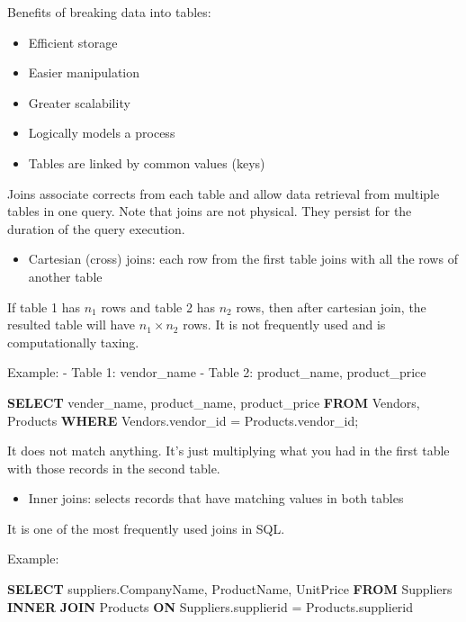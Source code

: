 \documentclass[]{book}
\newenvironment{Shaded}{\begin{snugshade}}{\end{snugshade}}
\newcommand{\KeywordTok}[1]{\textcolor[rgb]{0.13,0.29,0.53}{\textbf{{#1}}}}
\newcommand{\NormalTok}[1]{{#1}}
\providecommand{\tightlist}{%
  \setlength{\itemsep}{0pt}\setlength{\parskip}{0pt}}
\theoremstyle{definition}
\theoremstyle{definition}
\theoremstyle{remark}
\begin{document}
Benefits of breaking data into tables:

\begin{itemize}
\tightlist
\item
  Efficient storage
\item
  Easier manipulation
\item
  Greater scalability
\item
  Logically models a process
\item
  Tables are linked by common values (keys)
\end{itemize}

Joins associate corrects from each table and allow data retrieval from
multiple tables in one query. Note that joins are not physical. They
persist for the duration of the query execution.

\begin{itemize}
\tightlist
\item
  Cartesian (cross) joins: each row from the first table joins with all
  the rows of another table
\end{itemize}

If table 1 has \(n_1\) rows and table 2 has \(n_2\) rows, then after
cartesian join, the resulted table will have \(n_1 \times n_2\) rows. It
is not frequently used and is computationally taxing.

Example: - Table 1: vendor\_name - Table 2: product\_name,
product\_price

\begin{Shaded}
\begin{Highlighting}[]
\KeywordTok{SELECT} \NormalTok{vender_name, product_name, product_price}
\KeywordTok{FROM} \NormalTok{Vendors, Products}
\KeywordTok{WHERE} \NormalTok{Vendors.vendor_id = Products.vendor_id;}
\end{Highlighting}
\end{Shaded}

It does not match anything. It's just multiplying what you had in the
first table with those records in the second table.

\begin{itemize}
\tightlist
\item
  Inner joins: selects records that have matching values in both tables
\end{itemize}

It is one of the most frequently used joins in SQL.

Example:

\begin{Shaded}
\begin{Highlighting}[]
\KeywordTok{SELECT} \NormalTok{suppliers.CompanyName, ProductName, UnitPrice}
\KeywordTok{FROM} \NormalTok{Suppliers }\KeywordTok{INNER} \KeywordTok{JOIN} \NormalTok{Products }
\KeywordTok{ON} \NormalTok{Suppliers.supplierid = Products.supplierid}
\end{Highlighting}
\end{Shaded}
\end{document}
